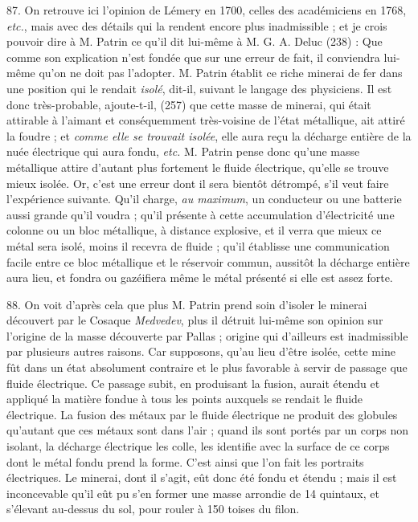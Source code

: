 \documentclass[a4paper, 11pt, oneside, polutonikogreek, french]{article}
\begin{document}
87. On retrouve ici l'opinion de Lémery en 1700, celles des académiciens en 1768, \emph{etc.}, mais avec des détails qui la rendent encore plus inadmissible ; et je crois pouvoir dire à M. Patrin ce qu'il dit lui-même à M. G. A. Deluc (238) : \og Que comme son explication n'est fondée que sur une erreur de fait, il conviendra lui-même qu'on ne doit pas l'adopter. \fg M. Patrin établit ce riche minerai de fer dans une position qui le rendait \emph{isolé}, dit-il, suivant le langage des physiciens. Il est donc très-probable, ajoute-t-il, (257) que cette masse de minerai, qui était attirable à l'aimant et conséquemment très-voisine de l'état métallique, ait attiré la foudre ; et \emph{comme elle se trouvait isolée}, elle aura reçu la décharge entière de la nuée électrique qui aura fondu, \emph{etc.} M. Patrin pense donc qu'une masse métallique attire d'autant plus fortement le fluide électrique, qu'elle se trouve mieux isolée. Or, c'est une erreur dont il sera bientôt détrompé, s'il veut faire l'expérience suivante. Qu'il charge, \emph{au maximum}, un conducteur ou une batterie aussi grande qu'il voudra ; qu'il présente à cette accumulation d'électricité une colonne ou un bloc métallique, à distance explosive, et il verra que mieux ce métal sera isolé, moins il recevra de fluide ; qu'il établisse une communication facile entre ce bloc métallique et le réservoir commun, aussitôt la décharge entière aura lieu, et fondra ou gazéifiera même le métal présenté si elle est assez forte.

88. On voit d'après cela que plus M. Patrin prend soin d'isoler le minerai découvert par le Cosaque \emph{Medvedev}, plus il détruit lui-même son opinion sur l'origine de la masse découverte par Pallas ; origine qui d'ailleurs est inadmissible par plusieurs autres raisons. Car supposons, qu'au lieu d'être isolée, cette mine fût dans un état absolument contraire et le plus favorable à servir de passage que fluide électrique. Ce passage subit, en produisant la fusion, aurait étendu et appliqué la matière fondue à tous les points auxquels se rendait le fluide électrique. La fusion des métaux par le fluide électrique ne produit des globules qu'autant que ces métaux sont dans l'air ; quand ils sont portés par un corps non isolant, la décharge électrique les colle, les identifie avec la surface de ce corps dont le métal fondu prend la forme. C'est ainsi que l'on fait les portraits électriques. Le minerai, dont il s'agit, eût donc été fondu et étendu ; mais il est inconcevable qu'il eût pu s'en former une masse arrondie de 14 quintaux, et s'élevant au-dessus du sol, pour rouler à 150 toises du filon.
\end{document}
